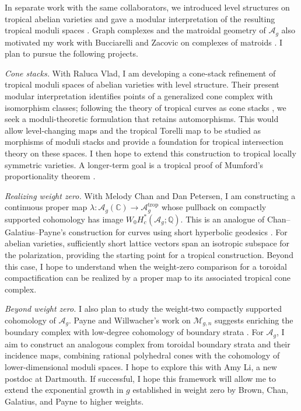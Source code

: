 \documentclass[11pt,reqno]{amsart}
\newcommand{\cA}{\mathcal{A}}
\newcommand{\cM}{\mathcal{M}}
\newcommand{\Q}{\mathbb{Q}}
\newcommand{\C}{\mathbb{C}}
\newcommand{\trop}{\mathrm{trop}}
\begin{document}
In separate work with the same collaborators, we introduced level structures on tropical abelian varieties and gave a modular interpretation of the resulting tropical moduli spaces \cite{ABBCV26}. Graph complexes and the matroidal geometry of $\cA_g$ also motivated my work with Bucciarelli and Zacovic on complexes of matroids \cite{BBZ26}. I plan to pursue the following projects.

\emph{Cone stacks.}
With Raluca Vlad, I am developing a cone-stack refinement of tropical moduli spaces of abelian varieties with level structure. Their present modular interpretation identifies points of a generalized cone complex with isomorphism classes; following the theory of tropical curves as cone stacks \cite{CCUW20}, we seek a moduli-theoretic formulation that retains automorphisms. This would allow level-changing maps and the tropical Torelli map to be studied as morphisms of moduli stacks and provide a foundation for tropical intersection theory on these spaces. I then hope to extend this construction to tropical locally symmetric varieties. A longer-term goal is a tropical proof of Mumford's proportionality theorem \cite{Mum77}.

\emph{Realizing weight zero.}
With Melody Chan and Dan Petersen, I am constructing a continuous proper map
$\lambda\colon\cA_g(\C)\to\cA_g^{\trop}$
whose pullback on compactly supported cohomology has image $W_0H_c^*(\cA_g;\Q)$. This is an analogue of Chan--Galatius--Payne's construction for curves using short hyperbolic geodesics \cite[\S7]{CGP21}. For abelian varieties, sufficiently short lattice vectors span an isotropic subspace for the polarization, providing the starting point for a tropical construction. Beyond this case, I hope to understand when the weight-zero comparison for a toroidal compactification can be realized by a proper map to its associated tropical cone complex.

\emph{Beyond weight zero.}
I also plan to study the weight-two compactly supported cohomology of $\cA_g$. Payne and Willwacher's work on $\cM_{g,n}$ suggests enriching the boundary complex with low-degree cohomology of boundary strata \cite{PW24}. For $\cA_g$, I aim to construct an analogous complex from toroidal boundary strata and their incidence maps, combining rational polyhedral cones with the cohomology of lower-dimensional moduli spaces. I hope to explore this with Amy Li, a new postdoc at Dartmouth. If successful, I hope this framework will allow me to extend the exponential growth in $g$ established in weight zero by Brown, Chan, Galatius, and Payne \cite{BCGP24} to higher weights.
\end{document}

